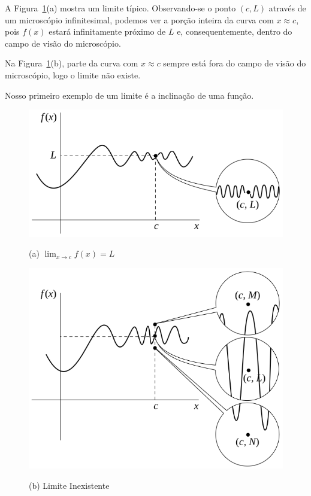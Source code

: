 A Figura~\ref{fig:exgraphlimits}(a) mostra um limite típico. Observando-se o
ponto $(c, L)$ através de um microscópio infinitesimal, podemos ver a
porção inteira da curva com $x \approx c$, pois $f(x)$ estará infinitamente
próximo de $L$ e, consequentemente, dentro do campo de visão do microscópio.

Na Figura~\ref{fig:exgraphlimits}(b), parte da curva com $x \approx c$
sempre está fora do campo de visão do microscópio, logo o limite não existe.

Nosso primeiro exemplo de um limite é a inclinação de uma função.

\begin{figure}
\begin{center}
\includegraphics{typicallimit}

(a) \; $\displaystyle \lim_{x \to c} f(x) = L$

\includegraphics{inexistentlimit}

(b) \; Limite Inexistente
\end{center}
\caption{}\label{fig:exgraphlimits}
\end{figure}

